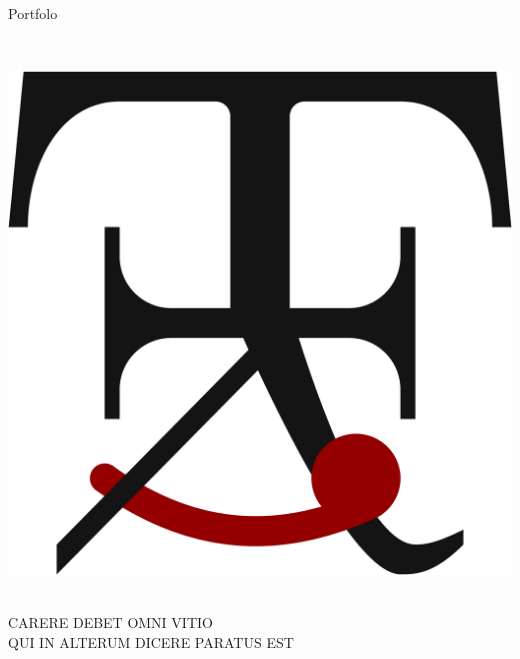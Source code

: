 

    \null
    \vfill
    \begin{center}
        {\fontsize{50pt}{20pt}\selectfont\color{COLV}Portfol\blackcolouri o}\\
        \strut\\
    \end{center}
    \vfill
    \begin{center}
    \includegraphics[width=0.3\linewidth]{./TikZimages/logoofficial.pdf}\\
    {\small\trjnfamily \strut\\ CARERE DEBET OMNI VITIO\\ QUI IN ALTERUM DICERE PARATUS EST}
    \end{center}


